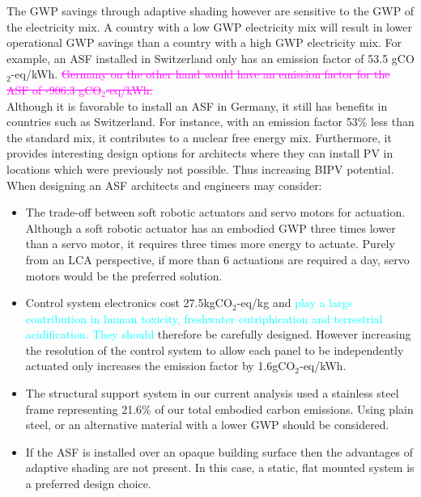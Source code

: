 The GWP savings through adaptive shading however are sensitive to the GWP of the electricity mix. A country with a low GWP electricity mix will result in lower operational GWP savings than a country with a high GWP electricity mix. For example, an ASF installed in Switzerland only has an emission factor of 53.5 gCO$_{2}$-eq/kWh. \textcolor{magenta}{\sout{Germany on the other hand would have an emission factor for the ASF of -906.3  gCO$_{2}$-eq/kWh.}}\\

Although it is favorable to install an ASF in Germany, it still has benefits in countries such as Switzerland. For instance, with an emission factor 53\% less than the standard mix, it contributes to a nuclear free energy mix. Furthermore, it provides interesting design options for architects where they can install PV in locations which were previously not possible. Thus increasing BIPV potential.  \\

When designing an ASF architects and engineers may consider: 
\begin{itemize}
\item The trade-off between soft robotic actuators and servo motors for actuation. Although a soft robotic actuator has an embodied GWP three times lower than a servo motor, it requires three times more energy to actuate. Purely from an LCA perspective, if more than 6 actuations are required a day, servo motors would be the preferred solution. 
\item Control system electronics cost 27.5kgCO$_{2}$-eq/kg and \textcolor{cyan}{play a large contribution in human toxicity, freshwater eutriphication and terrestrial acidification. They should} therefore be carefully designed. However increasing the resolution of the control system to allow each panel to be independently actuated only increases the emission factor by 1.6gCO$_{2}$-eq/kWh.
\item The structural support system in our current analysis used a stainless steel frame representing 21.6\% of our total embodied carbon emissions. Using plain steel, or an alternative material with a lower GWP should be considered.
\item If the ASF is installed over an opaque building surface then the advantages of adaptive shading are not present. In this case, a static, flat mounted system is a preferred design choice. 
\end{itemize}


